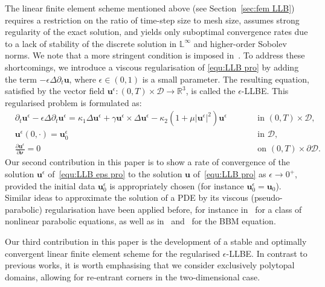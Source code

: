 \documentclass[11pt,reqno]{amsart}
\theoremstyle{definition}
\numberwithin{equation}{section}
\newcommand{\bff}{\boldsymbol}
\newcommand{\bb}{\mathbb}
\newcommand{\pa}{\partial}
\begin{document}
The linear finite element scheme mentioned above (see Section~\ref{sec:fem LLB}) requires a restriction on the ratio of time-step size to mesh size, assumes strong regularity of the exact solution, and yields only suboptimal convergence rates due to a lack of stability of the discrete solution in $\bb{L}^\infty$ and higher-order Sobolev norms. We note that a more stringent condition is imposed in~\citep{BenEssAyo24}.
To address these shortcomings, we introduce a viscous regularisation of \eqref{equ:LLB pro} by adding the term $-\epsilon
\Delta\partial_t \bff{u}$, where $\epsilon \in (0,1)$ is a small
parameter. The resulting equation, satisfied by the vector field
$\bff{u}^\epsilon:(0,T)\times \mathscr{D} \to \bb{R}^3$, is called the $\epsilon$-LLBE. This regularised problem is formulated as:
\begin{subequations}\label{equ:LLB eps pro}
	\begin{alignat}{2}
		&\partial_t \bff{u}^\epsilon
		-
		\epsilon \Delta \partial_t \bff{u}^\epsilon
		= 
		\kappa_1\Delta\bff{u}^\epsilon
		+
		\gamma\bff{u}^\epsilon\times  \Delta\bff{u}^\epsilon
		-
		\kappa_2(1+\mu|\bff{u}^\epsilon|^2)\bff{u}^\epsilon
		\qquad&
		&\text{in } (0,T)\times \mathscr{D},
		\label{equ:LLB eps}
		\\
		&\bff{u}^\epsilon(0,\cdot)=\bff{u}_0^\epsilon
		\qquad&
		&\text{in } \mathscr{D},
		\label{equ:ue ini con}
		\\
		&\frac{\pa\bff{u}^{\epsilon}}{\pa\bff{\nu}} = 0
		\qquad&
		&\text{on } (0,T)\times \pa \mathscr{D}.
		\label{equ:ue bou con}
	\end{alignat}
\end{subequations}
Our second contribution in this paper is to show a rate of convergence of the solution
$\bff{u}^\epsilon$ of~\eqref{equ:LLB eps pro} to the
solution $\bff{u}$ of~\eqref{equ:LLB pro} as $\epsilon\to 0^+$, provided the initial data $\bff{u}_0^\epsilon$ is appropriately chosen (for instance $\bff{u}_0^\epsilon= \bff{u}_0$). Similar ideas to
approximate the solution of a PDE by its viscous (pseudo-parabolic)
regularisation have been applied before, for instance in~\citep{NovPeg91, ShoTin70} for a
class of nonlinear parabolic equations, as well as in~\citep{BBM72} and~\citep{AngTra90} for the BBM
equation.


Our third contribution in this paper is the development of a stable and optimally convergent linear finite element scheme for the regularised $\epsilon$-LLBE. In contrast to previous works, it is worth emphasising that we consider exclusively polytopal domains, allowing for re-entrant corners in the two-dimensional case. 
\end{document}
